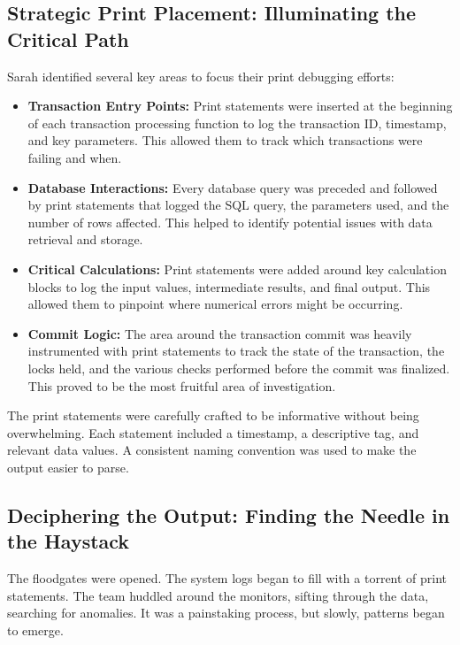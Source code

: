 \documentclass{article}
\begin{document}
{{{{\subsection*{Strategic Print Placement: Illuminating the Critical Path}

Sarah identified several key areas to focus their print debugging efforts:

\begin{itemize}
    \item \textbf{Transaction Entry Points:} Print statements were inserted at the beginning of each transaction processing function to log the transaction ID, timestamp, and key parameters. This allowed them to track which transactions were failing and when.
    \item \textbf{Database Interactions:} Every database query was preceded and followed by print statements that logged the SQL query, the parameters used, and the number of rows affected. This helped to identify potential issues with data retrieval and storage.
    \item \textbf{Critical Calculations:} Print statements were added around key calculation blocks to log the input values, intermediate results, and final output. This allowed them to pinpoint where numerical errors might be occurring.
    \item \textbf{Commit Logic:} The area around the transaction commit was heavily instrumented with print statements to track the state of the transaction, the locks held, and the various checks performed before the commit was finalized. This proved to be the most fruitful area of investigation.
\end{itemize}

The print statements were carefully crafted to be informative without being overwhelming. Each statement included a timestamp, a descriptive tag, and relevant data values. A consistent naming convention was used to make the output easier to parse.

\subsection*{Deciphering the Output: Finding the Needle in the Haystack}

The floodgates were opened. The system logs began to fill with a torrent of print statements. The team huddled around the monitors, sifting through the data, searching for anomalies. It was a painstaking process, but slowly, patterns began to emerge.

}}}}
\end{document}
